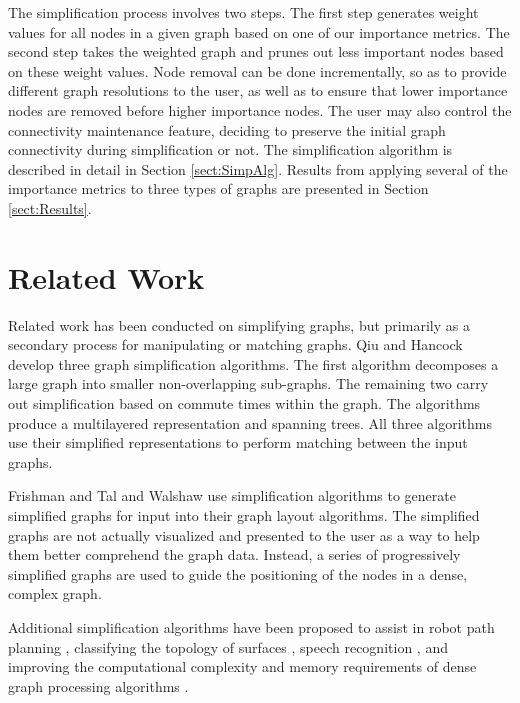 The simplification process involves two steps.  The first step generates weight values for all nodes in a given graph based on one of our importance metrics.  The second step takes the weighted graph and prunes out less important nodes based on these weight values.  Node removal can be done incrementally, so as to provide different graph resolutions to the user, as well as to ensure that lower importance nodes are removed before higher importance nodes.  The user may also control the connectivity maintenance feature, deciding to preserve the initial graph connectivity during simplification or not.  The simplification algorithm is described in detail in Section \ref{sect:SimpAlg}. Results from applying several of the importance metrics to three types of graphs are presented in Section \ref{sect:Results}.

\section{Related Work}
Related work has been conducted on simplifying graphs, but primarily as a secondary process for manipulating or  matching graphs.  Qiu and Hancock \cite{Qiu-Hancock04,Qiu-Hancock07} develop three graph simplification algorithms.  The first algorithm decomposes a large graph into smaller non-overlapping sub-graphs.  The remaining two carry out simplification based on commute times within the graph.  The algorithms produce a multilayered representation and spanning trees. All three algorithms use their simplified representations to perform matching between the input graphs.

Frishman and Tal \cite{Frishman-Tal07} and Walshaw \cite{Walshaw03} use simplification algorithms to generate simplified graphs for input into their graph layout algorithms.  The simplified graphs are not actually visualized and presented to the user as a way to help them better comprehend the graph data.  Instead, a series of progressively simplified graphs are used to guide the positioning of the nodes in a dense, complex graph.

Additional simplification algorithms have been proposed to assist in robot path planning \cite{Rizzi98}, classifying the topology of surfaces \cite{Ban-Sen03}, speech recognition \cite{LiuHarJohJam03}, and improving the computational complexity and memory requirements of dense graph processing algorithms \cite{KaoOccTen98,suel01compressing,Feder-Motwani95}.

